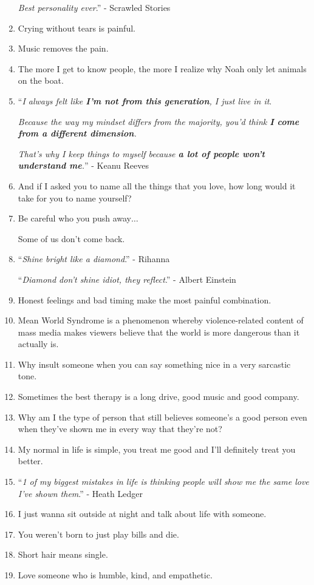 \documentclass{article}
\begin{document}
\begin{enumerate}
	\textit{Best personality ever}.'' - Scrawled Stories
	\item Crying without tears is painful.
	\item Music removes the pain.
	\item The more I get to know people, the more I realize why Noah only let animals on the boat.
	\item ``\textit{I always felt like \textbf{I'm not from this generation}, I just live in it}.
	
	\textit{Because the way my mindset differs from the majority, you'd think \textbf{I come from a different dimension}.}
	
	\textit{That's why I keep things to myself because \textbf{a lot of people won't understand me}.}'' - Keanu Reeves
	\item And if I asked you to name all the things that you love, how long would it take for you to name yourself?
	\item Be careful who you push away$\ldots$
	
	Some of us don't come back.
	\item ``\textit{Shine bright like a diamond}.'' - Rihanna
	
	``\textit{Diamond don't shine idiot, they reflect}.'' - Albert Einstein
	\item Honest feelings and bad timing make the most painful combination.
	\item Mean World Syndrome is a phenomenon whereby violence-related content of mass media makes viewers believe that the world is more dangerous than it actually is.
	\item Why insult someone when you can say something nice in a very sarcastic tone.
	\item Sometimes the best therapy is a long drive, good music and good company.
	\item Why am I the type of person that still believes someone's a good person even when they've shown me in every way that they're not?
	\item My normal in life is simple, you treat me good and I'll definitely treat you better.
	\item ``\textit{1 of my biggest mistakes in life is thinking people will show me the same love I've shown them}.'' - Heath Ledger
	\item I just wanna sit outside at night and talk about life with someone.
	\item You weren't born to just play bills and die.
	\item Short hair means single.
	\item Love someone who is humble, kind, and empathetic.
	

\end{enumerate}
\end{document}
